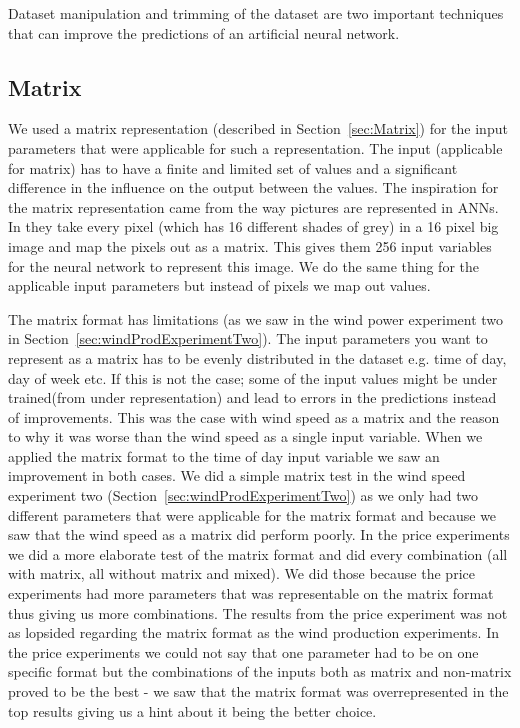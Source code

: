 Dataset manipulation and trimming of the dataset are two important techniques that can improve the predictions of an artificial neural network.
\subsection{Matrix}
We used a matrix representation (described in Section~\ref{sec:Matrix}) for the input parameters that were applicable for such a representation. The input (applicable for matrix) has to have a finite and limited set of values and a significant difference in the influence on the output between the values. The inspiration for the matrix representation came from the way pictures are represented in ANNs. In \cite{knerr1992handwritten} they take every pixel (which has 16 different shades of grey) in a 16 pixel big image and map the pixels out as a matrix. This gives them 256 input variables for the neural network to represent this image. We do the same thing for the applicable input parameters but instead of pixels we map out values.

The matrix format has limitations (as we saw in the wind power experiment two in Section~\ref{sec:windProdExperimentTwo}). The input parameters you want to represent as a matrix has to be evenly distributed in the dataset e.g. time of day, day of week etc. If this is not the case; some of the input values might be under trained(from under representation) and lead to errors in the predictions instead of improvements. This was the case with wind speed as a matrix and the reason to why it was worse than the wind speed as a single input variable. When we applied the matrix format to the time of day input variable we saw an improvement in both cases. We did a simple matrix test in the wind speed experiment two (Section~\ref{sec:windProdExperimentTwo}) as we only had two different parameters that were applicable for the matrix format and because we saw that the wind speed as a matrix did perform poorly. In the price experiments we did a more elaborate test of the matrix format and did every combination (all with matrix, all without matrix and mixed). We did those because the price experiments had more parameters that was representable on the matrix format thus giving us more combinations. The results from the price experiment was not as lopsided regarding the matrix format as the wind production experiments. In the price experiments we could not say that one parameter had to be on one specific format but the combinations of the inputs both as matrix and non-matrix proved to be the best - we saw that the matrix format was overrepresented in the top results giving us a hint about it being the better choice.

